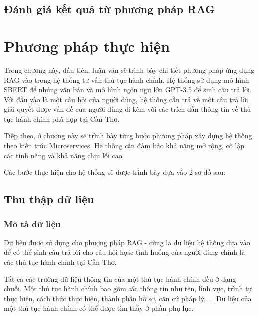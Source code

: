 \documentclass[a4paper, 12pt, openany]{book}
\begin{document}
\subsection{Đánh giá kết quả từ phương pháp RAG}

\section{Phương pháp thực hiện}
Trong chương này, đầu tiên, luận văn sẽ trình bày chi tiết phương pháp ứng dụng RAG vào trong hệ thống tư vấn thủ tục hành chính. Hệ thống sử dụng
mô hình SBERT để nhúng văn bản và mô hình ngôn ngữ lớn GPT-3.5 để sinh câu trả lời. Với đầu vào là một câu hỏi của người dùng, 
hệ thống cần trả về một câu trả lời giải quyết được vấn đề của người dùng đi kèm với các trích dẫn thông tin về thủ tục hành chính phù hợp tại Cần Thơ.

Tiếp theo, ở chương này sẽ trình bày từng bước phương pháp xây dựng hệ thống theo kiến trúc Microservices.
Hệ thống cần đảm bảo khả năng mở rộng, cô lập các tính năng và khả năng chịu lỗi cao.

Các bước thực hiện cho hệ thống sẽ được trình bày dựa vào 2 sơ đồ sau:
\subsection{Thu thập dữ liệu}
\subsubsection{Mô tả dữ liệu}
Dữ liệu được sử dụng cho phương pháp RAG - cũng là dữ liệu hệ thống dựa vào để có thể sinh câu trả lời cho câu hỏi họăc tình huống
của người dùng chính là các thủ tục hành chính tại Cần Thơ.

Tất cả các trường dữ liệu thông tin của một thủ tục hành chính đều ở dạng chuỗi. Một thủ tục hành chính bao gồm các thông tin như tên, lĩnh vực, trình tự thực hiện,
cách thức thực hiện, thành phần hồ sơ, căn cứ pháp lý, ... Dữ liệu của một thủ tục hành chính có thể được tìm thấy ở phần phụ lục.
\end{document}
